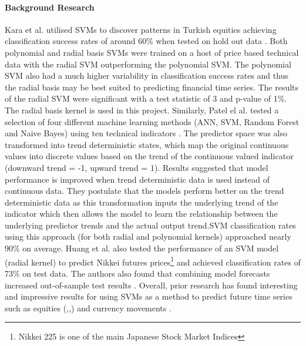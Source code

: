 \documentclass[11pt]{article}
\begin{document}
\paragraph{Background Research}
 Kara et al. utilised SVMs to discover patterns in Turkish equities achieving classification success rates of around 60\% when tested on hold out data \cite{Kara2011}. Both polynomial and radial basis SVMs were trained on a host of price based technical data with the radial SVM outperforming the polynomial SVM. The polynomial SVM also had a much higher variability in classification success rates and thus the radial basis may be best suited to predicting financial time series. The results of the radial SVM were significant with a test statistic of 3 and p-value of 1\%. The radial basis kernel is used in this project.
\newline Similarly, Patel el al. tested a selection of four different machine learning methods (ANN, SVM, Random Forest and Naive Bayes) using ten technical indicators \cite{Patel2015}. The predictor space was also transformed into trend deterministic states, which map the original continuous values into discrete values based on the trend of the continuous valued indicator (downward trend = -1, upward trend = 1). Results suggested that model performance is improved when trend deterministic data is used instead of continuous data. They postulate that the models perform better on the trend deterministic data as this transformation inputs the underlying trend of the indicator which then allows the model to learn the relationship between the underlying predictor trends and the actual output trend.\newline SVM classification rates using this approach (for both radial and polynomial kernels) approached nearly 90\% on average.
Huang et al. also tested the performance of an SVM model (radial kernel) to predict Nikkei futures prices\footnote{Nikkei 225 is one of the main Japanese Stock Market Indices} and achieved classification rates of 73\% on test data. The authors also found that combining model forecasts increased out-of-sample test results \cite{Huang2005}.
Overall, prior research has found interesting and impressive results for using SVMs as a method to predict future time series such as equities (\cite{Gui2015},\cite{Shen2012},\cite{Kim2003}) and currency movements \cite{Kamruzzaman2004}.
\end{document}
